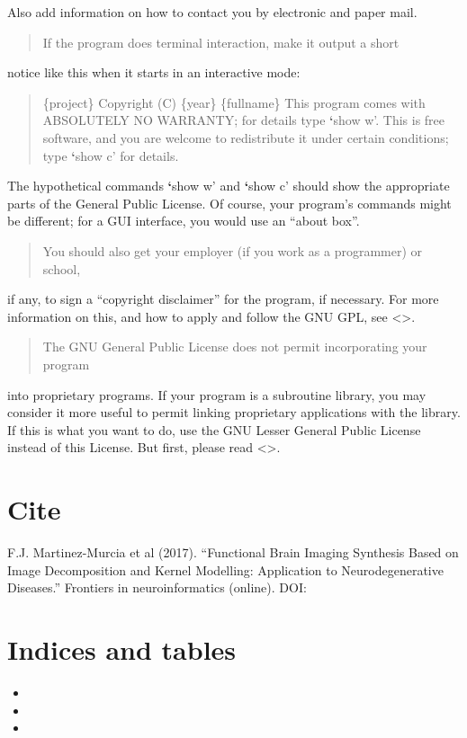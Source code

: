 \documentclass[letterpaper,10pt,english]{sphinxmanual}
\begin{document}
Also add information on how to contact you by electronic and paper mail.
\begin{quote}

If the program does terminal interaction, make it output a short
\end{quote}

notice like this when it starts in an interactive mode:
\begin{quote}

\{project\}  Copyright (C) \{year\}  \{fullname\}
This program comes with ABSOLUTELY NO WARRANTY; for details type {\color{red}\bfseries{}{}`}show w’.
This is free software, and you are welcome to redistribute it
under certain conditions; type {\color{red}\bfseries{}{}`}show c’ for details.
\end{quote}

The hypothetical commands {\color{red}\bfseries{}{}`}show w’ and {\color{red}\bfseries{}{}`}show c’ should show the appropriate
parts of the General Public License.  Of course, your program’s commands
might be different; for a GUI interface, you would use an “about box”.
\begin{quote}

You should also get your employer (if you work as a programmer) or school,
\end{quote}

if any, to sign a “copyright disclaimer” for the program, if necessary.
For more information on this, and how to apply and follow the GNU GPL, see
\textless{}\textgreater{}.
\begin{quote}

The GNU General Public License does not permit incorporating your program
\end{quote}

into proprietary programs.  If your program is a subroutine library, you
may consider it more useful to permit linking proprietary applications with
the library.  If this is what you want to do, use the GNU Lesser General
Public License instead of this License.  But first, please read
\textless{}\textgreater{}.


\chapter{Cite}
\label{\detokenize{index:cite}}
F.J. Martinez-Murcia et al (2017). “Functional Brain Imaging Synthesis Based on Image Decomposition and Kernel Modelling: Application to Neurodegenerative Diseases.” Frontiers in neuroinformatics (online). DOI: 


\chapter{Indices and tables}
\label{\detokenize{index:indices-and-tables}}\begin{itemize}
\item {} 

\item {} 

\item {} 

\end{itemize}



\renewcommand{\indexname}{Index}
\printindex
\end{document}
